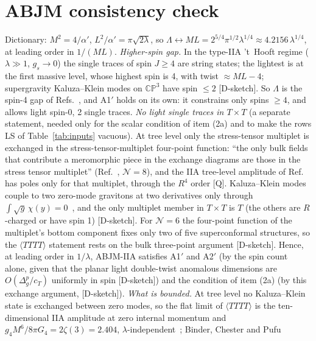 \documentclass[aps,prl,onecolumn,superscriptaddress,nofootinbib]{revtex4-2}
\begin{document}




\section{ABJM consistency check}
\label{sec:abjm}
Dictionary: $M^2=4/\alpha'$, $L^2/\alpha'=\pi\sqrt{2\lambda}$, so
$\Lambda\leftrightarrow ML=2^{5/4}\pi^{1/2}\lambda^{1/4}\approx4.2156\,\lambda^{1/4}$, at leading order in $1/(ML)$.
\emph{Higher-spin gap.} In the type-IIA 't~Hooft regime ($\lambda\gg1$, $g_s\to0$) the single traces of spin
$J\ge4$ are string states; the lightest is at the first massive level, whose highest spin is 4, with twist
$\approx ML-4$; supergravity Kaluza--Klein modes on $\mathbb{CP}^3$ have spin $\le2$ [D-sketch]. So $\Lambda$ is the
spin-4 gap of Refs.~\cite{CHLPS,CHMRSswamp}, and A1$'$ holds on its own: it constrains only spins $\ge4$, and allows
light spin-0, 2 single traces. \emph{No light single traces in $T\times T$} (a separate statement, needed only
for the scalar condition of item (2a) and to make the rows LS of Table~\ref{tab:inputs} vacuous). At tree level only the
stress-tensor multiplet is exchanged in the stress-tensor-multiplet four-point function: ``the only bulk fields
that contribute a meromorphic piece in the exchange diagrams are those in the stress tensor multiplet''
(Ref.~\cite{CPY}, $\mathcal N=8$), and the IIA tree-level amplitude of Ref.~\cite{BCP} has poles only for that
multiplet, through the $R^4$ order [Q]. Kaluza--Klein modes couple to two zero-mode gravitons at two derivatives
only through $\int\sqrt g\,\chi(y)=0$~\cite{CHLPS}, and the only multiplet member in $T\times T$ is $T$ (the others are
$R$-charged or have spin 1) [D-sketch]. For $\mathcal N=6$ the four-point function of the multiplet's bottom component
fixes only two of five superconformal structures, so the $\langle TTTT\rangle$ statement rests on the bulk
three-point argument [D-sketch]. Hence, at leading order in $1/\lambda$, ABJM-IIA satisfies A1$'$ and A2$'$ (by the spin count alone, given that the planar light double-twist anomalous dimensions are $O(\Delta_g^p/c_T)$ uniformly in spin [D-sketch]) and the
condition of item (2a) (by this exchange argument, [D-sketch]).
\emph{What is bounded.} At tree level no Kaluza--Klein state is exchanged between zero modes, so the flat limit of
$\langle TTTT\rangle$ is the ten-dimensional IIA amplitude at zero internal momentum and
$g_4M^6/8\pi G_4=2\zeta(3)=2.404$, $\lambda$-independent~\cite[Sec.~3.8, Eq.~(3.43)]{CHMRSswamp}; Binder, Chester and Pufu~\cite{BCP}
\end{document}
